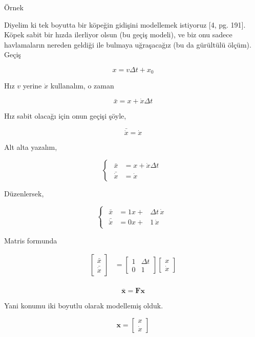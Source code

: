 \documentclass[12pt,fleqn]{article}\usepackage{../../common}
\begin{document}
Örnek

Diyelim ki tek boyutta bir köpeğin gidişini modellemek istiyoruz [4,
pg. 191]. Köpek sabit bir hızda ilerliyor olsun (bu geçiş modeli), ve biz
onu sadece havlamaların nereden geldiği ile bulmaya uğraşacağız (bu da
gürültülü ölçüm). Geçiş

$$ x = v \Delta t + x_0$$

Hız $v$ yerine $\dot{x}$ kullanalım, o zaman 

$$\bar x = x + \dot x \Delta t$$

Hız sabit olacağı için onun geçişi şöyle,

$$\bar{\dot x} = \dot x$$

Alt alta yazalım,

$$\begin{cases}
\begin{aligned}
\bar x &= x + \dot x \Delta t \\
\bar{\dot x} &= \dot x
\end{aligned}
\end{cases}$$

Düzenlersek,

$$\begin{cases}
\begin{aligned}
\bar x &= 1x + &\Delta t\, \dot x \\
\bar{\dot x} &=0x + &1\, \dot x
\end{aligned}
\end{cases}$$

Matris formunda

$$\begin{aligned}
\begin{bmatrix}\bar x \\ \bar{\dot x}\end{bmatrix} &= \begin{bmatrix}1&\Delta t  \\ 0&1\end{bmatrix}  \begin{bmatrix}x \\ \dot x\end{bmatrix}\\
\end{aligned}$$

$$ \mathbf{\bar x} = \mathbf{Fx} $$

Yani konumu iki boyutlu olarak modellemiş olduk.

$$\mathbf x =\begin{bmatrix}x \\ \dot x\end{bmatrix}$$
\end{document}
